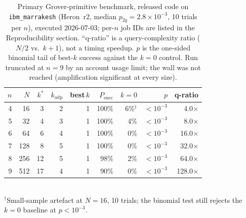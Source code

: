 \documentclass[journal]{IEEEtran}
\begin{document}
\begin{table}[t]
\centering
\caption{Primary Grover-primitive benchmark, released code on
\texttt{ibm\_marrakesh} (Heron~r2, median $p_{2q}=2.8\times10^{-3}$, 10 trials per
$n$), executed 2026-07-03; per-$n$ job IDs are listed in the Reproducibility
section. ``q-ratio'' is a query-complexity ratio ($N/2$ vs.\ $k{+}1$), not a
timing speedup. $p$ is the one-sided binomial tail of best-$k$ success against
the $k{=}0$ control. Run truncated at $n{=}9$ by an account usage limit; the wall
was not reached (amplification significant at every size).}
\label{tab:hwbench}
\small
\setlength{\tabcolsep}{3pt}
\begin{tabular}{@{}rrrrrrrrr@{}}
\toprule
$n$ & $N$ & $k^{*}$ & $k_{\mathrm{adp}}$ & best\,$k$ & $P_{\text{succ}}$ & $k{=}0$ & $p$ & q-ratio \\
\midrule
4 & 16  & 3  & 2 & 1 & 100\% & 6\%$^\dagger$ & $<10^{-3}$ & 4.0$\times$ \\
5 & 32  & 4  & 3 & 1 & 100\% & 4\% & $<10^{-3}$ & 8.0$\times$ \\
6 & 64  & 6  & 4 & 1 & 100\% & 0\% & $<10^{-3}$ & 16.0$\times$ \\
7 & 128 & 8  & 5 & 1 & 100\% & 0\% & $<10^{-3}$ & 32.0$\times$ \\
8 & 256 & 12 & 5 & 1 & 98\%  & 2\% & $<10^{-3}$ & 64.0$\times$ \\
9 & 512 & 17 & 4 & 1 & 90\%  & 0\% & $<10^{-3}$ & 128.0$\times$ \\
\bottomrule
\end{tabular}\\[2pt]
{\footnotesize $^\dagger$Small-sample artefact at $N{=}16$, 10 trials; the
binomial test still rejects the $k{=}0$ baseline at $p<10^{-3}$.}
\end{table}
\end{document}
